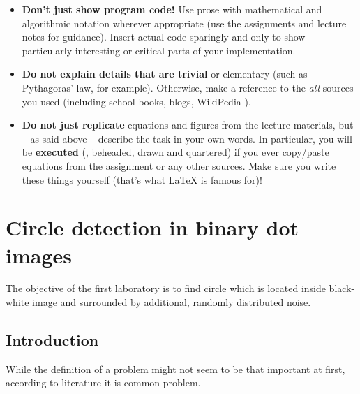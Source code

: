 \documentclass[notitlepage,english]{hgbreport}
\begin{document}
\begin{itemize}
\item
\textbf{Don't just show program code!}
Use prose with mathematical and algorithmic notation wherever appropriate (use the assignments
and lecture notes for guidance).
Insert actual code sparingly and only to show particularly interesting or critical parts 
of your implementation.
\item
\textbf{Do not explain details that are trivial} or elementary (such as Pythagoras' law, 
for example). Otherwise, make a reference to the \textit{all} sources 
you used (including school books, blogs, WikiPedia \etc).
\item
\textbf{Do not just replicate} equations and figures from the lecture materials, but
-- as said above -- describe the task in your own words. 
In particular, you will be \textbf{executed} (\ie, beheaded, drawn and quartered) if you
ever copy/paste equations from the assignment or
any other sources. Make sure you write these things yourself (that's what LaTeX is 
famous for)!
\end{itemize}







\chapter{Circle detection in binary dot images}

The objective of the first laboratory is to find circle which is located inside black-white image and surrounded by additional, randomly distributed noise.

\section{Introduction}

While the definition of a problem might not seem to be that important at first, according to literature it is common problem.

\MakeBibliography[nosplit]
\end{document}

